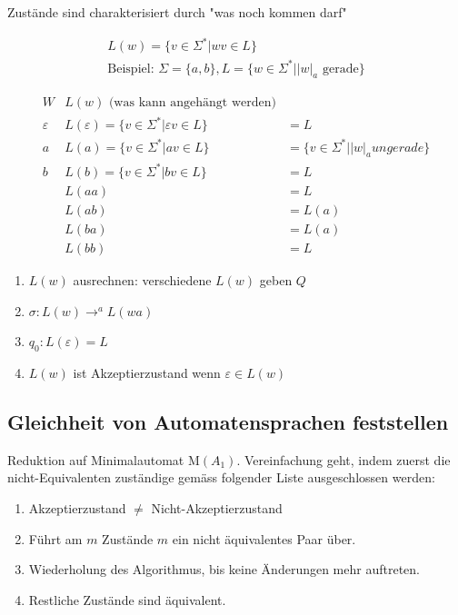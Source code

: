 Zustände sind charakterisiert durch "was noch kommen darf"

\begin{align*}
	L(w) = \{v \in \Sigma^\ast | wv \in L \} \\
	\text{Beispiel: } \Sigma = \{a, b \}, L=\{ w \in \Sigma^\ast | |w|_a \text{ gerade}\}
\end{align*}



\begin{align*}
W & L(w) \text{ (was kann angehängt werden)}\\
\varepsilon & L(\varepsilon) = \{v \in \Sigma^\ast | \varepsilon v \in L \} &= L \\
a & L(a) = \{v \in \Sigma^\ast | a v \in L \} &= \{ v \in \Sigma^\ast | |w|_a ungerade \}\\
b & L(b) = \{v \in \Sigma^\ast | b v \in L \} &= L\\
  & L(aa) &= L \\
  & L(ab) &= L(a) \\
  & L(ba) &= L(a) \\
  & L(bb) &= L
\end{align*}

\begin{enumerate}
	\item $L(w)$ ausrechnen: verschiedene $L(w)$ geben $Q$ 
	\item $\sigma: L(w) \rightarrow^a L(wa)$
	\item $q_0: L(\varepsilon) = L$
	\item $L(w)$ ist Akzeptierzustand wenn $\varepsilon \in L(w)$
\end{enumerate}

\subsection{Gleichheit von Automatensprachen feststellen}
	Reduktion auf Minimalautomat M$(A_1)$. Vereinfachung geht, indem zuerst die nicht-Equivalenten zuständige gemäss folgender Liste ausgeschlossen werden:

\begin{enumerate}
	\item Akzeptierzustand $\neq$ Nicht-Akzeptierzustand 
	\item Führt am $m$ Zustände $m$ ein nicht äquivalentes Paar über.
	\item Wiederholung des Algorithmus, bis keine Änderungen mehr auftreten.
	\item Restliche Zustände sind äquivalent.
\end{enumerate}

